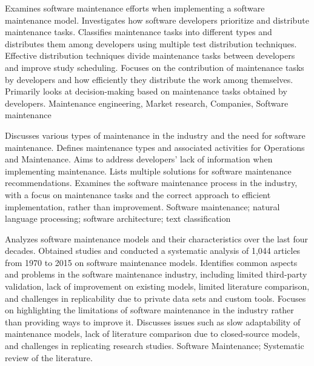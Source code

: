 {
    Examines software maintenance efforts when implementing a software maintenance model. Investigates how software developers prioritize and distribute maintenance tasks.
}
{
    Classifies maintenance tasks into different types and distributes them among developers using multiple test distribution techniques.
}
{
    Effective distribution techniques divide maintenance tasks between developers and improve study scheduling.
}
{
    Focuses on the contribution of maintenance tasks by developers and how efficiently they distribute the work among themselves. Primarily looks at decision-making based on maintenance tasks obtained by developers.
}
{
    Maintenance engineering, Market research, Companies, Software maintenance
}

{
    Discusses various types of maintenance in the industry and the need for software maintenance. Defines maintenance types and associated activities for Operations and Maintenance.
}
{
    Aims to address developers' lack of information when implementing maintenance.
}
{
    Lists multiple solutions for software maintenance recommendations.
}
{
    Examines the software maintenance process in the industry, with a focus on maintenance tasks and the correct approach to efficient implementation, rather than improvement.
}
{
    Software maintenance; natural language processing; software architecture; text classification
}

{
    Analyzes software maintenance models and their characteristics over the last four decades.
}
{
    Obtained studies and conducted a systematic analysis of 1,044 articles from 1970 to 2015 on software maintenance models.
}
{
    Identifies common aspects and problems in the software maintenance industry, including limited third-party validation, lack of improvement on existing models, limited literature comparison, and challenges in replicability due to private data sets and custom tools.
}
{
    Focuses on highlighting the limitations of software maintenance in the industry rather than providing ways to improve it. Discusses issues such as slow adaptability of maintenance models, lack of literature comparison due to closed-source models, and challenges in replicating research studies.
}
{
    Software Maintenance; Systematic review of the literature.
}

